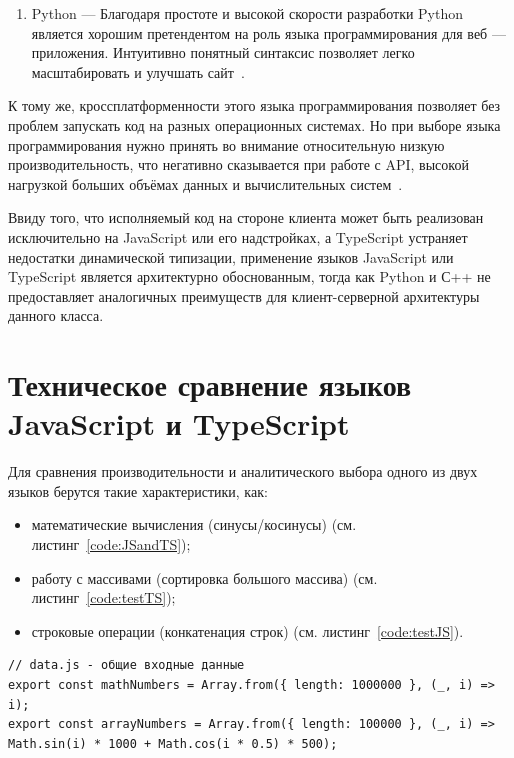 \begin{enumerate}
    \item Python — Благодаря простоте и высокой скорости разработки Python является хорошим претендентом на роль языка программирования для веб — приложения. Интуитивно понятный синтаксис позволяет легко масштабировать и улучшать сайт~\cite{pythonProgramming}. 
\end{enumerate}

К тому же, кроссплатформенности этого языка программирования позволяет без проблем запускать код на разных операционных системах. Но при выборе языка программирования нужно принять во внимание относительную низкую производительность, что негативно сказывается при работе с API, высокой нагрузкой больших объёмах данных и вычислительных систем~\cite{pythonProgramming}.

Ввиду того, что исполняемый код на стороне клиента может быть реализован исключительно на JavaScript или его надстройках, а TypeScript устраняет недостатки динамической типизации, применение языков  JavaScript или TypeScript является архитектурно обоснованным, тогда как Python и С++ не предоставляет аналогичных преимуществ для клиент-серверной архитектуры данного класса.

\section{Техническое сравнение языков JavaScript и TypeScript}

Для сравнения производительности и аналитического выбора одного из двух языков берутся такие характеристики, как:

\begin{itemize}
 \item математические вычисления (синусы/косинусы) (см. листинг~\ref{code:JSandTS});
 \item работу с массивами (сортировка большого массива) (см. листинг~\ref{code:testTS});
 \item строковые операции (конкатенация строк) (см. листинг~\ref{code:testJS}).
\end{itemize}

\begin{code}
\label{code:JSandTS}
\vspace{-0.75cm}\begin{verbatim}
// data.js - общие входные данные
export const mathNumbers = Array.from({ length: 1000000 }, (_, i) => i);
export const arrayNumbers = Array.from({ length: 100000 }, (_, i) => Math.sin(i) * 1000 + Math.cos(i * 0.5) * 500);
\end{verbatim}
\end{code}

